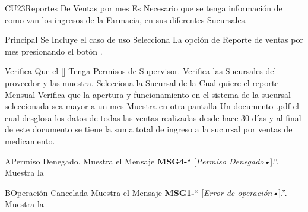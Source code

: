 \begin{UseCase}{CU23}{Reportes De Ventas por mes}{
	Es Necesario que se tenga información  de como van los ingresos de la Farmacia, en sus diferentes Sucursales.
	}
	\end{UseCase}
	\begin{UCtrayectoria}{Principal}
		\UCpaso Se Incluye el caso de uso 
		\UCpaso[\UCactor] Selecciona La opción de Reporte de ventas por mes presionando el botón .

		\UCpaso Verifica Que el [\UCactor] Tenga Permisos de Supervisor.
		\UCpaso Verifica las Sucursales del proveedor y las muestra.
		\UCpaso [\UCactor] Selecciona la Sucursal de la Cual quiere el reporte Mensual
		\UCpaso Verifica que la apertura y funcionamiento en el sistema de la sucursal seleccionada sea mayor a un mes
		\UCpaso Muestra en otra pantalla Un documento .pdf el cual desglosa los datos de todas las ventas realizadas desde hace 30 días y al final de este documento se tiene la suma total de ingreso a la sucursal por ventas de medicamento.
	\end{UCtrayectoria}



\begin{UCtrayectoriaA}{A}{Permiso Denegado.}
			\UCpaso Muestra el Mensaje {\bf MSG4-}`` [{\em Permiso Denegado\textsl{•}}].''.
			\UCpaso Muestra la 
\end{UCtrayectoriaA}
\begin{UCtrayectoriaA}{B}{Operación Cancelada}
	\UCpaso Muestra el Mensaje {\bf MSG1-}`` [{\em Error de operación\textsl{•}}].''.
			\UCpaso Muestra la 
\end{UCtrayectoriaA}